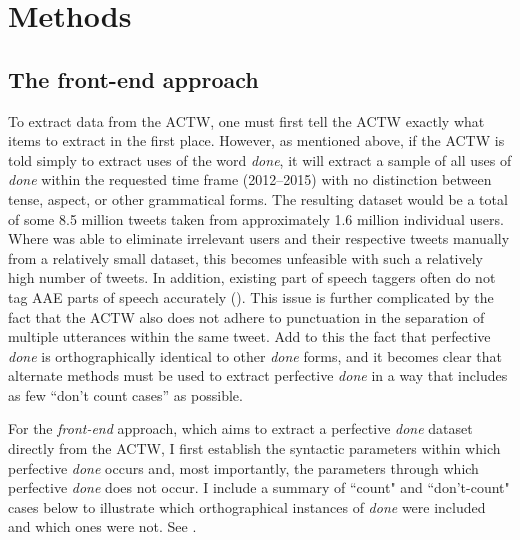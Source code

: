 \documentclass[output=paper,draftmode,colorlinks,citecolor=brown]{langscibook}
\begin{document}
\section{Methods}
\label{sec:baxter:4}
\subsection{The front-end approach}
\label{sec:baxter:4.1}
To extract data from the ACTW, one must first tell the ACTW exactly what items to extract in the first place. However, as mentioned above, if the ACTW is told simply to extract uses of the word \textit{done}, it will extract a sample of all uses of \textit{done} within the requested time frame (2012--2015) with no distinction between tense, aspect, or other grammatical forms. The resulting dataset would be a total of some 8.5 million tweets taken from approximately 1.6 million individual users. Where \citet{Willis2020} was able to eliminate irrelevant users and their respective tweets manually from a relatively small dataset, this becomes unfeasible with such a relatively high number of tweets. In addition, existing part of speech taggers often do not tag AAE parts of speech accurately (\citealt{JørgensenHovySøgaard2015, BlodgettEtAl2016}). This issue is further complicated by the fact that the ACTW also does not adhere to punctuation in the separation of multiple utterances within the same tweet. Add to this the fact that perfective \textit{done} is orthographically identical to other \textit{done} forms, and it becomes clear that alternate methods must be used to extract perfective \textit{done} in a way that includes as few “don’t count cases” \citep{Blake1997} as possible.

For the \textit{front-end} approach, which aims to extract a perfective \textit{done} dataset directly from the ACTW, I first establish the syntactic parameters within which perfective \textit{done} occurs and, most importantly, the parameters through which perfective \textit{done} does not occur. I include a summary of ``count" and ``don’t-count" cases below to illustrate which orthographical instances of \textit{done} were included and which ones were not. See .
\end{document}
